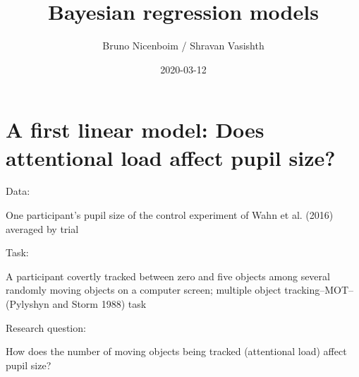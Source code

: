 \documentclass[12pt,ignorenonframetext,aspectratio=169]{beamer}
\title{Bayesian regression models}
\author{Bruno Nicenboim / Shravan Vasishth}
\date{2020-03-12}
\begin{document}
\frame{\titlepage}

\begin{frame}
\tableofcontents[hideallsubsections]
\end{frame}
\hypertarget{sec:pupil}{%
\section{A first linear model: Does attentional load affect pupil size?}\label{sec:pupil}}

\small

\normalsize

\begin{frame}

\begin{block}{Data:}

One participant's pupil size of the control experiment of Wahn et al. (2016) averaged by trial

\end{block}

\begin{block}{Task:}

A participant covertly tracked between zero and five objects among several randomly moving objects on a computer screen; multiple object tracking--MOT-- (Pylyshyn and Storm 1988) task

\end{block}

\begin{block}{Research question:}

How does the number of moving objects being tracked (attentional load) affect pupil size?

\end{block}

\end{frame}
\end{document}
